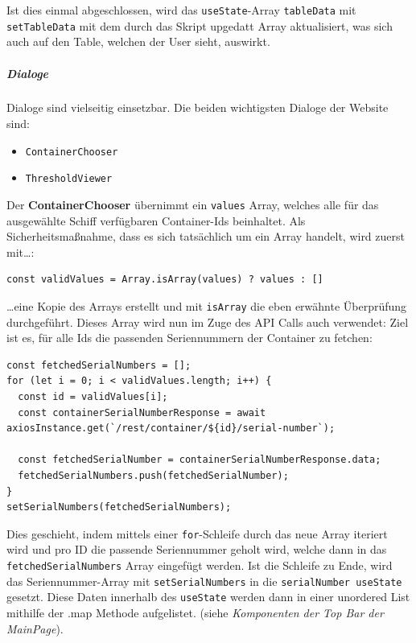 \documentclass[
    headings=optiontotocandhead,%
    twoside,
    numbers=noenddot,%
    12pt, %
    titlepage, %
    parskip=full, %
    listof=leveldown, 
    numbers=noenddot, %
    a4paper,DIV=14,
    BCOR=15mm,
]{scrbook}
\newcommand{\passthrough}[1]{#1}
\providecommand{\tightlist}{%
  \setlength{\itemsep}{0pt}\setlength{\parskip}{0pt}}
\begin{document}
Ist dies einmal abgeschlossen, wird das
\passthrough{\lstinline!useState!}-Array
\passthrough{\lstinline!tableData!} mit
\passthrough{\lstinline!setTableData!} mit dem durch das Skript upgedatt
Array aktualisiert, was sich auch auf den Table, welchen der User sieht,
auswirkt.

\hypertarget{dialoge}{%
\subparagraph{Dialoge}\label{dialoge}}

Dialoge sind vielseitig einsetzbar. Die beiden wichtigsten Dialoge der
Website sind:

\begin{itemize}
\tightlist
\item
  \passthrough{\lstinline!ContainerChooser!}
\item
  \passthrough{\lstinline!ThresholdViewer!}
\end{itemize}

Der \textbf{ContainerChooser} übernimmt ein
\passthrough{\lstinline!values!} Array, welches alle für das ausgewählte
Schiff verfügbaren Container-Ids beinhaltet. Als Sicherheitsmaßnahme,
dass es sich tatsächlich um ein Array handelt, wird zuerst mit\ldots:

\begin{lstlisting}[caption={Überprüfung ob eine Variable tatsächlich ein Array ist}]
const validValues = Array.isArray(values) ? values : []
\end{lstlisting}

\ldots eine Kopie des Arrays erstellt und mit
\passthrough{\lstinline!isArray!} die eben erwähnte Überprüfung
durchgeführt. Dieses Array wird nun im Zuge des API Calls auch
verwendet: Ziel ist es, für alle Ids die passenden Seriennummern der
Container zu fetchen:

\begin{lstlisting}[caption={Fetchen und speichern der Serien Nummern der Container}]
const fetchedSerialNumbers = [];
for (let i = 0; i < validValues.length; i++) {
  const id = validValues[i];
  const containerSerialNumberResponse = await axiosInstance.get(`/rest/container/${id}/serial-number`);
  
  const fetchedSerialNumber = containerSerialNumberResponse.data;
  fetchedSerialNumbers.push(fetchedSerialNumber);
}
setSerialNumbers(fetchedSerialNumbers);
\end{lstlisting}

Dies geschieht, indem mittels einer
\passthrough{\lstinline!for!}-Schleife durch das neue Array iteriert
wird und pro ID die passende Seriennummer geholt wird, welche dann in
das \passthrough{\lstinline!fetchedSerialNumbers!} Array eingefügt
werden. Ist die Schleife zu Ende, wird das Seriennummer-Array mit
\passthrough{\lstinline!setSerialNumbers!} in die
\passthrough{\lstinline!serialNumber useState!} gesetzt. Diese Daten
innerhalb des \passthrough{\lstinline!useState!} werden dann in einer
unordered List mithilfe der .map Methode aufgelistet. (siehe
\emph{Komponenten der Top Bar der MainPage}).
\end{document}
